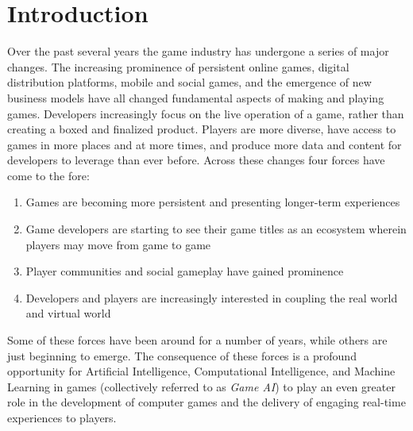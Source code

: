\documentclass[conference]{IEEEtran}
\begin{document}

\section{Introduction}
Over the past several years the game industry has undergone a series of major changes. 
The increasing prominence of persistent online games, digital distribution platforms, mobile and social games, and the emergence of new business models have all changed fundamental aspects of making and playing games. 
Developers increasingly focus on the live operation of a game, rather than creating a boxed and finalized product.
Players are more diverse, have access to games in more places and at more times, and produce more data and content for developers to leverage than ever before. Across these changes four forces have come to the fore:
\begin{enumerate}
\item Games are becoming more persistent and presenting longer-term experiences %
\item Game developers are starting to see their game titles as an ecosystem wherein players may move from game to game %
\item Player communities and social gameplay have gained prominence
\item Developers and players are increasingly interested in coupling the real world and virtual world %
\end{enumerate}
\noindent
Some of these forces have been around for a number of years, while others are just beginning to emerge.
The consequence of these forces is a profound opportunity for Artificial Intelligence, Computational Intelligence, and Machine Learning in games (collectively referred to as {\em Game AI}) to play an even greater role in the development of computer games and the delivery of engaging real-time experiences to players. 
\end{document}
